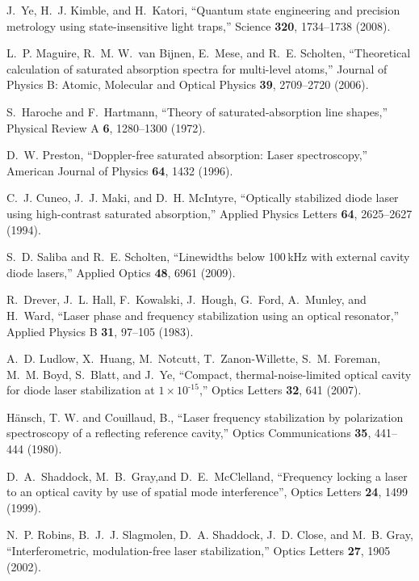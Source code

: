 \documentclass[10pt,letterpaper]{article}
\begin{document}
\begin{thebibliography}{10}
J.~Ye, H.~J. Kimble, and H.~Katori, \enquote{Quantum state engineering and
  precision metrology using state-insensitive light traps,}
  Science \textbf{320}, 1734--1738 (2008).

L.~P. Maguire, R.~M. W.~van Bijnen, E.~Mese, and R.~E. Scholten,
  \enquote{Theoretical calculation of saturated absorption spectra for
  multi-level atoms,} Journal of Physics B: Atomic, Molecular and Optical
  Physics \textbf{39}, 2709--2720 (2006).

S.~Haroche and F.~Hartmann, \enquote{Theory of saturated-absorption line
  shapes,} Physical Review A \textbf{6}, 1280--1300 (1972).

D.~W. Preston, \enquote{Doppler-free saturated absorption: Laser
  spectroscopy,} American Journal of Physics \textbf{64}, 1432 (1996).

C.~J. Cuneo, J.~J. Maki, and D.~H. McIntyre, \enquote{Optically stabilized
  diode laser using high-contrast saturated absorption,} Applied Physics
  Letters \textbf{64}, 2625--2627 (1994).

S.~D. Saliba and R.~E. Scholten, \enquote{Linewidths below 100\,kHz with
  external cavity diode lasers,} Applied Optics \textbf{48}, 6961 (2009).

R.~Drever, J.~L. Hall, F.~Kowalski, J.~Hough, G.~Ford, A.~Munley, and H.~Ward,
  \enquote{Laser phase and frequency stabilization using an optical resonator,}
  Applied Physics B \textbf{31}, 97--105 (1983).

A.~D. Ludlow, X.~Huang, M.~Notcutt, T.~Zanon-Willette, S.~M. Foreman, M.~M.
  Boyd, S.~Blatt, and J.~Ye, \enquote{Compact, thermal-noise-limited optical
  cavity for diode laser stabilization at $1\times10^{\textrm{-15}}$,} Optics
  Letters \textbf{32}, 641 (2007).
  
H\"ansch, T. W. and Couillaud, B., \enquote{Laser frequency stabilization by
  polarization spectroscopy of a reflecting reference cavity,}
  Optics Communications \textbf{35}, 441--444 (1980).

D.~A.~Shaddock, M.~B.~Gray,and D.~E.~McClelland,
\enquote{Frequency locking a laser to an optical cavity by use of spatial mode interference},
Optics Letters \textbf{24}, 1499 (1999).

N.~P. Robins, B.~J.~J. Slagmolen, D.~A. Shaddock, J.~D. Close, and M.~B. Gray,
  \enquote{Interferometric, modulation-free laser stabilization,} Optics
  Letters \textbf{27}, 1905 (2002).


\end{thebibliography}
\end{document}
